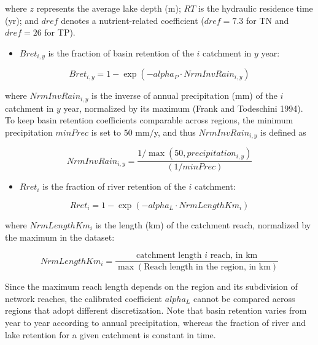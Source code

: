 \noindent where \(z\) represents the average lake depth (m); \(RT\) is the hydraulic residence time (yr); and \(dref\) denotes a nutrient-related coefficient (\(dref = 7.3\) for TN and \(dref = 26\) for TP).

\begin{itemize}
\tightlist
\item
  \(Bret_{i,y}\) is the fraction of basin retention of the \(i\) catchment in \(y\) year:
\end{itemize}

\begin{equation}
    Bret_{i,y} = 1 - \exp(-alpha_P \cdot NrmInvRain_{i,y})
    \label{eq:basin-retention}
  \end{equation}

\noindent where \(NrmInvRain_{i,y}\) is the inverse of annual precipitation (mm) of the \(i\) catchment in \(y\) year, normalized by its maximum (Frank and Todeschini 1994). To keep basin retention coefficients comparable across regions, the minimum precipitation \(minPrec\) is set to \(50\) mm/y, and thus \(NrmInvRain_{i,y}\) is defined as

\begin{equation*}
    NrmInvRain_{i,y} = \frac{1 / \max(50,  precipitation_{i,y})}{(1 / minPrec)} 
  \end{equation*}

\begin{itemize}
\tightlist
\item
  \(Rret_i\) is the fraction of river retention of the \(i\) catchment:
\end{itemize}

\begin{equation}
    Rret_i = 1 - \exp(-alpha_L \cdot NrmLengthKm_i) 
    \label{eq:river-retention}
  \end{equation}

\noindent where \(NrmLengthKm_i\) is the length (km) of the catchment reach, normalized by the maximum in the dataset:

\begin{equation*}
    NrmLengthKm_i = \frac{\textrm{catchment length } i \textrm{ reach, in km}}{\max(\textrm{Reach length in the region, in km})}
  \end{equation*}

\noindent Since the maximum reach length depends on the region and its subdivision of network reaches, the calibrated coefficient \(alpha_L\) cannot be compared across regions that adopt different discretization. Note that basin retention varies from year to year according to annual precipitation, whereas the fraction of river and lake retention for a given catchment is constant in time.

